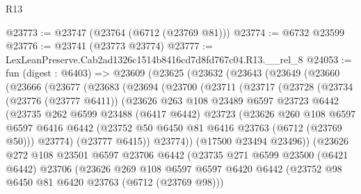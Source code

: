\begin{lexlean}{R13}
\begin{coremodule}
@23773 := @23747 (@23764 (@6712 (@23769 @81)))
@23774 := @6732 @23599
@23776 := @23741 (@23773 @23774)
@23777 := LexLeanPreserve.Cab2ad1326c1514b8416cd7d8fd767c04.R13.__rel_8
@24053 := fun (digest : @6403) =>
  @23609
    (@23625
      (@23632
        (@23643
          (@23649
            (@23660
              (@23666
                (@23677
                  (@23683
                    (@23694
                      (@23700
                        (@23711
                          (@23717
                            (@23728
                              (@23734
                                (@23776 (@23777 @6411))
                                (@23626
                                  @263
                                  @108
                                  @23489
                                  @6597
                                  @23723
                                  @6442
                                  (@23735
                                    @262
                                    @6599
                                    @23488
                                    (@6417 @6442)
                                    @23723
                                    (@23626
                                      @260
                                      @108
                                      @6597
                                      @6597
                                      @6416
                                      @6442
                                      (@23752 @50 @6450 @81 @6416 @23763 (@6712 (@23769 @50)))
                                      @23774)
                                    (@23777 @6415))
                                  @23774))
                              (@17500 @23494 @23496))
                            (@23626
                              @272
                              @108
                              @23501
                              @6597
                              @23706
                              @6442
                              (@23735
                                @271
                                @6599
                                @23500
                                (@6421 @6442)
                                @23706
                                (@23626
                                  @269
                                  @108
                                  @6597
                                  @6597
                                  @6420
                                  @6442
                                  (@23752 @98 @6450 @81 @6420 @23763 (@6712 (@23769 @98)))

\end{coremodule}
\end{lexlean}
